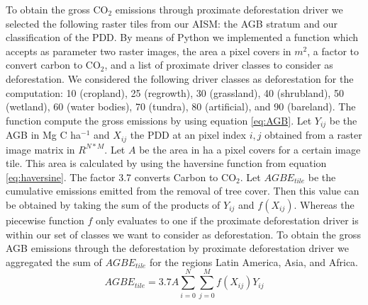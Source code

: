		To obtain the gross CO$_2$ emissions through proximate deforestation driver we selected the following raster tiles from our \ac{AISM}: the \ac{AGB} stratum and our classification of the \ac{PDD}. By means of Python we implemented a function which accepts as parameter two raster images, the area a pixel covers in $m^2$, a factor to convert carbon to CO$_2$, and a list of proximate driver classes to consider as deforestation. We considered the following driver classes as deforestation for the computation: 10 (cropland), 25 (regrowth), 30 (grassland), 40 (shrubland), 50 (wetland), 60 (water bodies), 70 (tundra), 80 (artificial), and 90 (bareland). The function compute the gross emissions by using  equation \ref{eq:AGB}. Let $Y_{ij}$ be the \ac{AGB} in Mg C ha$^{-1}$ and $X_{ij}$ the \ac{PDD} at an pixel index $i,j$ obtained from a raster image matrix in $R^{N*M}$. Let $A$ be the area in ha a pixel covers for a certain image tile. This area is calculated by using the haversine function from equation \ref{eq:haversine}. The factor 3.7 converts Carbon to CO$_2$. Let $AGBE_{tile}$ be the cumulative emissions emitted from the removal of tree cover. Then this value can be obtained by taking the sum of the products of $Y_{ij}$ and $f(X_{ij})$. Whereas the piecewise function $f$ only evaluates to one if the proximate deforestation driver is within our set of classes we want to consider as deforestation. To obtain the gross \ac{AGB} emissions through the deforestation by proximate deforestation driver we aggregated the sum of $AGBE_{tile}$ for the regions Latin America, Asia, and Africa.
		\begin{equation}
		\label{eq:AGB}
			AGBE_{tile} = 3.7A\displaystyle\sum_{i=0}^{N}\displaystyle\sum_{j=0}^{M} f(X_{ij})Y_{ij}
		\end{equation}

